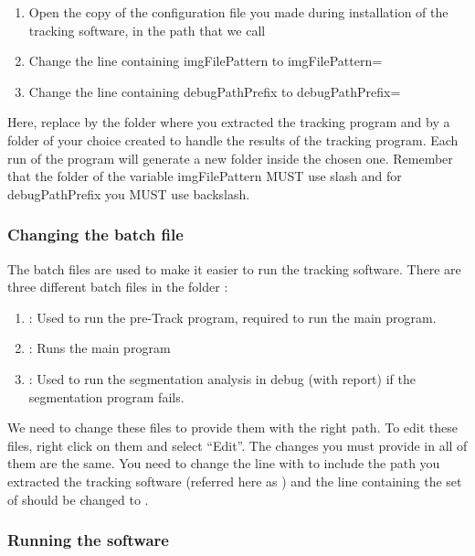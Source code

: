 \documentclass[12pt]{article}
\begin{document}
\begin{enumerate}
\item{Open the copy of the configuration file you made during installation of the tracking software, in the path that we call }
\item{Change the line containing imgFilePattern to imgFilePattern=}
\item{Change the line containing debugPathPrefix to debugPathPrefix=}
\end{enumerate}

Here, replace  by the folder where you extracted the tracking program and  by a folder of your choice created to handle the results of the tracking program. Each run of the program will generate a new folder inside the chosen one. Remember that the folder of the variable imgFilePattern MUST use slash and for debugPathPrefix you MUST use backslash.

\subsubsection{Changing the batch file}

The batch files are used to make it easier to run the tracking software. There are three different batch files in the folder :

\begin{enumerate}
\item{: Used to run the pre-Track program, required to run the main program.}
\item{: Runs the main program}
\item{: Used to run the segmentation analysis in debug (with report) if the segmentation program fails.}
\end{enumerate}

We need to change these files to provide them with the right path. To edit these files, right click on them and select ``Edit''. The changes you must provide in all of them are the same. You need to change the line with  to include the path you extracted the tracking software (referred here as ) and the line containing the set of  should be changed to .

\subsubsection{Running the software} \label{sec_run_c_tracking}
\end{document}
